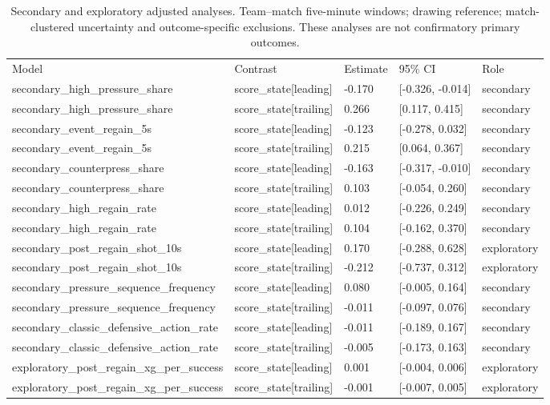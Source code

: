 \begin{table}[ht]
\centering
\small
\caption{Secondary and exploratory adjusted analyses. Team--match five-minute windows; drawing reference; match-clustered uncertainty and outcome-specific exclusions. These analyses are not confirmatory primary outcomes.}
\begin{tabular}{lllll}
\hline
Model & Contrast & Estimate & 95\% CI & Role \\
secondary\_high\_pressure\_share & score\_state[leading] & -0.170 & [-0.326, -0.014] & secondary \\
secondary\_high\_pressure\_share & score\_state[trailing] & 0.266 & [0.117, 0.415] & secondary \\
secondary\_event\_regain\_5s & score\_state[leading] & -0.123 & [-0.278, 0.032] & secondary \\
secondary\_event\_regain\_5s & score\_state[trailing] & 0.215 & [0.064, 0.367] & secondary \\
secondary\_counterpress\_share & score\_state[leading] & -0.163 & [-0.317, -0.010] & secondary \\
secondary\_counterpress\_share & score\_state[trailing] & 0.103 & [-0.054, 0.260] & secondary \\
secondary\_high\_regain\_rate & score\_state[leading] & 0.012 & [-0.226, 0.249] & secondary \\
secondary\_high\_regain\_rate & score\_state[trailing] & 0.104 & [-0.162, 0.370] & secondary \\
secondary\_post\_regain\_shot\_10s & score\_state[leading] & 0.170 & [-0.288, 0.628] & exploratory \\
secondary\_post\_regain\_shot\_10s & score\_state[trailing] & -0.212 & [-0.737, 0.312] & exploratory \\
secondary\_pressure\_sequence\_frequency & score\_state[leading] & 0.080 & [-0.005, 0.164] & secondary \\
secondary\_pressure\_sequence\_frequency & score\_state[trailing] & -0.011 & [-0.097, 0.076] & secondary \\
secondary\_classic\_defensive\_action\_rate & score\_state[leading] & -0.011 & [-0.189, 0.167] & secondary \\
secondary\_classic\_defensive\_action\_rate & score\_state[trailing] & -0.005 & [-0.173, 0.163] & secondary \\
exploratory\_post\_regain\_xg\_per\_success & score\_state[leading] & 0.001 & [-0.004, 0.006] & exploratory \\
exploratory\_post\_regain\_xg\_per\_success & score\_state[trailing] & -0.001 & [-0.007, 0.005] & exploratory \\

\end{tabular}
\end{table}
